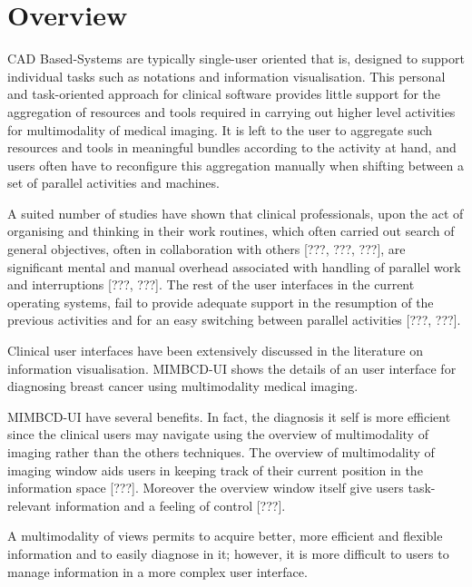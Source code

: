 
\chapter{Overview}
\label{chapter:chaptername}

CAD Based-Systems are typically single-user oriented that is, designed to support individual tasks such as notations and information visualisation. This personal and task-oriented approach for clinical software provides little support for the aggregation of resources and tools required in carrying out higher level activities for multimodality of medical imaging. It is left to the user to aggregate such resources and tools in meaningful bundles according to the activity at hand, and users often have to reconfigure this aggregation manually when shifting between a set of parallel activities and machines.

A  suited  number  of  studies  have  shown  that  clinical  professionals, upon the act of organising and thinking in their work routines, which often carried out search of general objectives, often in collaboration with others [???, ???, ???], are significant mental and manual overhead associated with handling of  parallel  work  and  interruptions [???,  ???]. The rest of the user  interfaces  in  the  current operating systems, fail to provide adequate support in the resumption of the previous  activities  and  for an  easy  switching  between  parallel  activities [???, ???].

Clinical user interfaces have been extensively discussed in the literature on information visualisation. MIMBCD-UI shows the details of an user interface for diagnosing breast cancer using multimodality medical imaging.

MIMBCD-UI have several benefits. In fact, the diagnosis it self is more efficient since the clinical users may navigate using the overview of multimodality of imaging rather than the others techniques. The overview of multimodality of imaging window aids users in keeping track of their current position in the information space [???]. Moreover the overview window itself give users task-relevant information and a feeling of control [???].

A multimodality of views permits to acquire better, more efficient and flexible information and to easily diagnose in it; however, it is more difficult to users to manage information in a more complex user interface.

